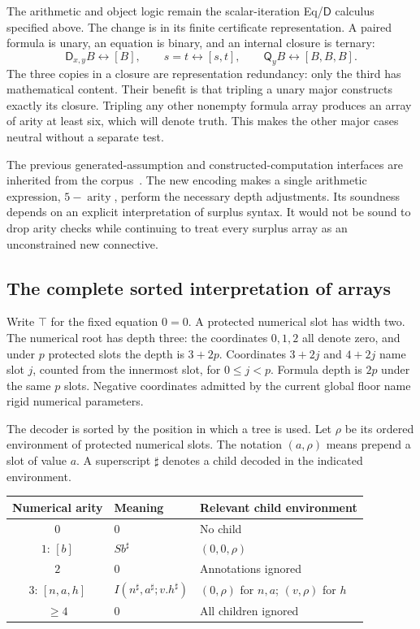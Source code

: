 \documentclass[11pt,letterpaper]{article}
\theoremstyle{definition}\newtheorem{definition}[theorem]{Definition}
\theoremstyle{remark}\newtheorem{remark}[theorem]{Remark}
\newcommand{\D}{\mathsf D}
\newcommand{\Q}{\mathsf Q}
\begin{document}
The arithmetic and object logic remain the scalar-iteration Eq/$\D$
calculus specified above.  The change is in its finite certificate
representation.  A paired formula is unary, an equation is binary, and
an internal closure is ternary:
\[
 \D_{x,y}B\longleftrightarrow[B],\qquad
 s=t\longleftrightarrow[s,t],\qquad
 \Q_yB\longleftrightarrow[B,B,B].
 \tag{Arity encoding}\label{eq:arity-encoding}
\]
The three copies in a closure are representation redundancy: only the
third has mathematical content.  Their benefit is that tripling a unary
major constructs exactly its closure.  Tripling any other nonempty
formula array produces an array of arity at least six, which will denote
truth.  This makes the other major cases neutral without a separate
test.

The previous generated-assumption and constructed-computation interfaces
are inherited from the corpus~\cite{generated,constructed}.  The new
encoding makes a single arithmetic expression, $5-\operatorname{arity}$,
perform the necessary depth adjustments.  Its soundness depends on an
explicit interpretation of surplus syntax.  It would not be sound to
drop arity checks while continuing to treat every surplus array as an
unconstrained new connective.

\subsection{The complete sorted interpretation of arrays}
\label{subsec:sorted-arrays}

Write $\top$ for the fixed equation $0=0$.  A protected numerical slot
has width two.  The numerical root has depth three: the coordinates
$0,1,2$ all denote zero, and under $p$ protected slots the depth is
$3+2p$.  Coordinates $3+2j$ and $4+2j$ name slot $j$, counted from
the innermost slot, for $0\leq j<p$.  Formula depth is $2p$ under the
same $p$ slots.  Negative coordinates admitted by the current global
floor name rigid numerical parameters.

The decoder is sorted by the position in which a tree is used.  Let
$\rho$ be its ordered environment of protected numerical slots.
The notation $(a,\rho)$ means prepend a slot of value $a$.
A superscript $\sharp$ denotes a child decoded in the indicated
environment.

\begin{center}
\begin{tabular}{cll}
\toprule
Numerical arity & Meaning & Relevant child environment\\
\midrule
$0$ & $0$ & No child\\
$1$: $[b]$ & $Sb^\sharp$ & $(0,0,\rho)$\\
$2$ & $0$ & Annotations ignored\\
$3$: $[n,a,h]$ & $I(n^\sharp,a^\sharp;v.h^\sharp)$ & $(0,\rho)$ for $n,a$; $(v,\rho)$ for $h$\\
$\geq4$ & $0$ & All children ignored\\
\bottomrule
\end{tabular}
\end{center}
\end{document}
